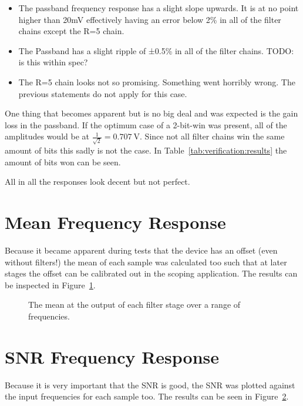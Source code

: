 \begin{itemize}
    \item The passband frequency response has a slight slope upwards. It is at no point higher than 20mV effectively having an error below 2\% in all of the filter chains except the R=5 chain.
    \item The Passband has a slight ripple of ±0.5\% in all of the filter chains. TODO: is this within spec?
    \item The R=5 chain looks not so promising. Something went horribly wrong. The previous statements do not apply for this case.
\end{itemize}

One thing that becomes apparent but is no big deal and was expected is the gain loss in the passband.
If the optimum case of a 2-bit-win was present, all of the amplitudes would be at $\frac{1}{\sqrt{2}} = \SI{0.707}{\V}$.
Since not all filter chains win the same amount of bits this sadly is not the case. In Table~\ref{tab:verification:results} the amount of bits won can be seen.

All in all the responses look decent but not perfect.

\section{Mean Frequency Response}
\label{sec:verification:mean}

Because it became apparent during tests that the device has an offset (even without filters!) the mean of each sample was calculated too such that at later stages the offset can be calibrated out in the scoping application.
The results can be inspected in Figure~\ref{fig:verification:rmsAll}.

\begin{figure}
    \centering
    
    \caption[The mean at the output of each filter stage over a range of frequencies.]{%
        The mean at the output of each filter stage over a range of frequencies.%
    }
    \label{fig:verification:rmsAll}
\end{figure}

\section{SNR Frequency Response}
\label{sec:verification:snr}

Because it is very important that the SNR is good, the SNR was plotted against the input frequencies for each sample too.
The results can be seen in Figure~\ref{sec:verification:snr}.

